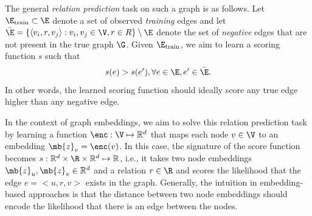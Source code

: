The general {\em relation prediction} task on such a  graph is as follows.
Let $\E_{\textrm{train}}\subset \E$ denote a set of observed {\em training} edges and let $\bar{\E} = \{\langle v_i, r, v_j \rangle : v_i, v_j \in \V, r \in R\} \setminus \E$ denote the set of {\em negative} edges that are not present in the true graph $\G$.
Given $\E_{\textrm{train}}$, we aim to learn a scoring function $s$ such that
\begin{equation}\label{eq:score}
    s(e) > s(e'), \forall e \in \E, e' \in \bar{\E}.
\end{equation}
In other words, the learned scoring function should ideally score any true edge higher than any negative edge. 

In the context of graph embeddings, we aim to solve this relation prediction task by learning a function $\enc : \V \mapsto \mathbb{R}^d$ that maps each node $v \in \V$ to an embedding $\mb{z}_v = \enc(v)$.
In this case, the signature of the score function becomes $s : \mathbb{R}^d \times \R \times \mathbb{R}^d \mapsto \mathbb{R}$, i.e., it takes two node embeddings $\mb{z}_u, \mb{z}_v \in \mathbb{R}^d$ and a relation $r \in \R$ and scores the likelihood that the edge $e=<u, r, v>$ exists in the graph. 
Generally, the intuition in embedding-based approaches is that the distance between two node embeddings should encode the likelihood that there is an edge between the nodes.%
